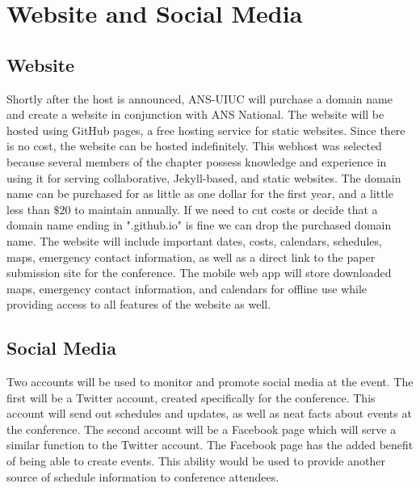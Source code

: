 \section{Website and Social Media}
\subsection{Website}
Shortly after the host is announced, ANS-UIUC will purchase a domain name and create a website in conjunction with ANS National. The website will be hosted using GitHub pages, a free hosting service for static websites. Since there is no cost, the website can be hosted indefinitely. This webhost was selected because several members of the chapter possess knowledge and experience in using it for serving collaborative, Jekyll-based, and static websites. The domain name can be purchased for as little as one dollar for the first year, and a little less than $\$20$ to maintain annually. If we need to cut costs or decide that a domain name ending in ".github.io" is fine we can drop the purchased domain name. The website will include important dates, costs, calendars, schedules, maps, emergency contact information, as well as a direct link to the paper submission site for the conference. The mobile web app will store downloaded maps, emergency contact information, and calendars for offline use while providing access to all features of the website as well.

\subsection{Social Media} 
Two accounts will be used to monitor and promote social media at the event. The first will be a Twitter account, created specifically for the conference. This account will send out schedules and updates, as well as neat facts about events at the conference. The second account will be a Facebook page which will serve a similar function to the Twitter account. The Facebook page has the added benefit of being able to create events. This ability would be used to provide another source of schedule information to conference attendees. 